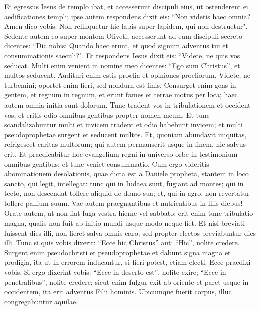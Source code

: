 \begin{biblechapter}  
\verse Et egressus Iesus de templo ibat, et accesserunt discipuli eius, ut ostenderent ei aedificationes templi; 
\verse ipse autem respondens dixit eis: “Non videtis haec omnia? Amen dico vobis: Non relinquetur hic lapis super lapidem, qui non destruetur". 
\verse Sedente autem eo super montem Oliveti, accesserunt ad eum discipuli secreto dicentes: “Dic nobis: Quando haec erunt, et quod signum adventus tui et consummationis saeculi?". 
\verse Et respondens Iesus dixit eis: “Videte, ne quis vos seducat. 
\verse Multi enim venient in nomine meo dicentes: “Ego sum Christus”, et multos seducent. 
\verse Audituri enim estis proelia et opiniones proeliorum. Videte, ne turbemini; oportet enim fieri, sed nondum est finis. 
\verse Consurget enim gens in gentem, et regnum in regnum, et erunt fames et terrae motus per loca; 
\verse haec autem omnia initia sunt dolorum. 
\verse Tunc tradent vos in tribulationem et occident vos, et eritis odio omnibus gentibus propter nomen meum. 
\verse Et tunc scandalizabuntur multi et invicem tradent et odio habebunt invicem; 
\verse et multi pseudoprophetae surgent et seducent multos. 
\verse Et, quoniam abundavit iniquitas, refrigescet caritas multorum; 
\verse qui autem permanserit usque in finem, hic salvus erit. 
\verse Et praedicabitur hoc evangelium regni in universo orbe in testimonium omnibus gentibus; et tunc veniet consummatio. 
\verse Cum ergo videritis abominationem desolationis, quae dicta est a Daniele propheta, stantem in loco sancto, qui legit, intellegat: 
\verse tunc qui in Iudaea sunt, fugiant ad montes; 
\verse qui in tecto, non descendat tollere aliquid de domo sua; 
\verse et, qui in agro, non revertatur tollere pallium suum. 
\verse Vae autem praegnantibus et nutrientibus in illis diebus! 
\verse Orate autem, ut non fiat fuga vestra hieme vel sabbato: 
\verse erit enim tunc tribulatio magna, qualis non fuit ab initio mundi usque modo neque fiet. 
\verse Et nisi breviati fuissent dies illi, non fieret salva omnis caro; sed propter electos breviabuntur dies illi. 
\verse Tunc si quis vobis dixerit: “Ecce hic Christus” aut: “Hic”, nolite credere. 
\verse Surgent enim pseudochristi et pseudoprophetae et dabunt signa magna et prodigia, ita ut in errorem inducantur, si fieri potest, etiam electi. 
\verse Ecce praedixi vobis. 
\verse Si ergo dixerint vobis: “Ecce in deserto est”, nolite exire; “Ecce in penetralibus”, nolite credere; 
\verse sicut enim fulgur exit ab oriente et paret usque in occidentem, ita erit adventus Filii hominis. 
\verse Ubicumque fuerit corpus, illuc congregabuntur aquilae. 

\end{biblechapter}
